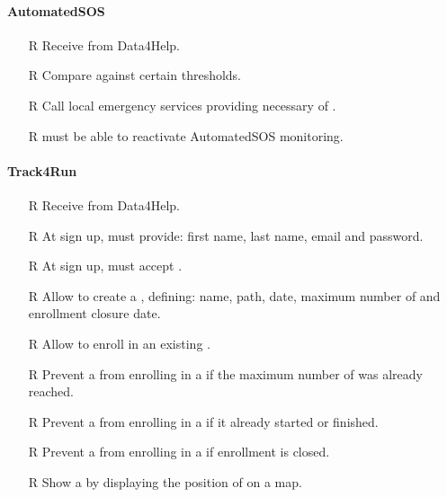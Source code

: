 \documentclass[../../../rasd.tex]{subfiles}
\begin{document}
        \paragraph{AutomatedSOS}
        \begin{itemize}
            \item[R\subs{36}]Receive  from Data4Help.
            \item[R\subs{37}]Compare  against certain thresholds.
            \item[R\subs{38}]Call local emergency services providing necessary  of .
            \item[R\subs{39}] must be able to reactivate AutomatedSOS monitoring.
        \end{itemize}

        \paragraph{Track4Run}
        \begin{itemize}
            \item[R\subs{40}]Receive  from Data4Help.
            \item[R\subs{41}]At sign up,  must provide: first name, last name, email and password.
            \item[R\subs{42}]At sign up,  must accept .
            \item[R\subs{43}]Allow  to create a , defining: name, path, date, maximum number of  and enrollment closure date. 
            \item[R\subs{44}]Allow  to enroll in an existing .
            \item[R\subs{45}]Prevent a  from enrolling in a  if the maximum number of  was already reached.
            \item[R\subs{46}]Prevent a  from enrolling in a  if it already started or finished.
            \item[R\subs{47}]Prevent a  from enrolling in a  if enrollment is closed.
            \item[R\subs{48}]Show a  by displaying the position of  on a map.
        \end{itemize}
\end{document}

